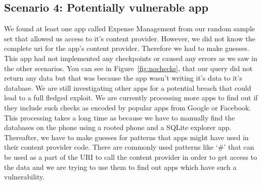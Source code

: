 \subsection{Scenario 4: Potentially vulnerable app} We found at least one app called Expense Management from our random sample set that allowed us access to it's content provider. However, we did not know the complete uri for the app's content provider. Therefore we had to make guesses. This app had not implemented any checkpoints or caused any errors as we saw in the other scenarios. You can see in Figure~\ref{fig:nochecks}, that our query did not return any data but that was because the app wasn't writing it's data to it's database. We are still investigating other apps for a potential breach that could lead to a full fledged exploit. We are currently processing more apps to find out if they include such checks as encoded by popular apps from Google or Facebook. This processing takes a long time as because we have to manually find the databases on the phone using a rooted phone and a SQLite explorer app. Thereafter, we have to make guesses for patterns that apps might have used in their content provider code. There are commonly used patterns like `\#' that can be used as a part of the URI to call the content provider in order to get access to the data and we are trying to use them to find out apps which have such a vulnerability.